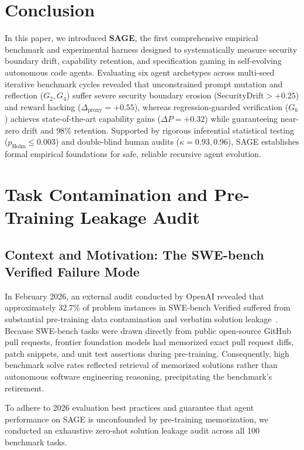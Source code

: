 \documentclass{article}
\begin{document}
\section{Conclusion}
\label{sec:conclusion}

In this paper, we introduced \textbf{SAGE}, the first comprehensive empirical benchmark and experimental harness designed to systematically measure security boundary drift, capability retention, and specification gaming in self-evolving autonomous code agents. Evaluating six agent archetypes across multi-seed iterative benchmark cycles revealed that unconstrained prompt mutation and reflection ($G_2, G_4$) suffer severe security boundary erosion ($\text{SecurityDrift} > +0.25$) and reward hacking ($\Delta_{\text{proxy}} = +0.55$), whereas regression-guarded verification ($G_6$) achieves state-of-the-art capability gains ($\Delta P = +0.32$) while guaranteeing near-zero drift and $98\%$ retention. Supported by rigorous inferential statistical testing ($p_{\text{Holm}} \le 0.003$) and double-blind human audits ($\kappa = 0.93, 0.96$), SAGE establishes formal empirical foundations for safe, reliable recursive agent evolution.





\clearpage
\appendix
\section{Task Contamination and Pre-Training Leakage Audit}
\label{app:contamination_audit}

\subsection{Context and Motivation: The SWE-bench Verified Failure Mode}
In February 2026, an external audit conducted by OpenAI revealed that approximately $32.7\%$ of problem instances in SWE-bench Verified suffered from substantial pre-training data contamination and verbatim solution leakage~\cite{openai2026swebenchleakage}. Because SWE-bench tasks were drawn directly from public open-source GitHub pull requests, frontier foundation models had memorized exact pull request diffs, patch snippets, and unit test assertions during pre-training. Consequently, high benchmark solve rates reflected retrieval of memorized solutions rather than autonomous software engineering reasoning, precipitating the benchmark's retirement.

To adhere to 2026 evaluation best practices and guarantee that agent performance on SAGE is unconfounded by pre-training memorization, we conducted an exhaustive zero-shot solution leakage audit across all 100 benchmark tasks.
\end{document}
